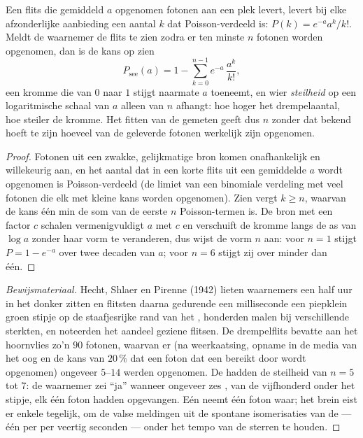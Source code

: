 \begin{theorem}\label{thm:b3:sensory-systems:hecht}
Een flits die gemiddeld $a$ opgenomen fotonen aan een plek 
levert, levert bij elke afzonderlijke aanbieding een aantal $k$ dat
Poisson-verdeeld is: $P(k) = e^{-a}a^{k}/k!$. Meldt de waarnemer de
flits te zien zodra er ten minste $n$ fotonen worden opgenomen, dan is
de kans op zien
\[
P_{\text{see}}(a) = 1 - \sum_{k=0}^{n-1} e^{-a}\,\frac{a^{k}}{k!} ,
\]
een kromme die van $0$ naar $1$ stijgt naarmate $a$ toeneemt, en wier
\emph{steilheid} op een logaritmische schaal van $a$ alleen van $n$
afhangt: hoe hoger het drempelaantal, hoe steiler de kromme. Het fitten
van de gemeten  geeft dus $n$ zonder dat
bekend hoeft te zijn hoeveel van de geleverde fotonen werkelijk zijn
opgenomen.
\end{theorem}
\begin{proof}
Fotonen uit een zwakke, gelijkmatige bron komen onafhankelijk en
willekeurig aan, en het aantal dat in een korte flits uit een
gemiddelde $a$ wordt opgenomen is Poisson-verdeeld (de limiet van een
binomiale verdeling met veel fotonen die elk met kleine kans worden
opgenomen). Zien vergt $k \ge n$, waarvan de kans één min de som van de
eerste $n$ Poisson-termen is. De bron met een factor $c$ schalen
vermenigvuldigt $a$ met $c$ en verschuift de kromme langs de as van $\log a$
zonder haar vorm te veranderen, dus wijst de vorm $n$ aan: voor $n =
1$ stijgt $P = 1 - e^{-a}$ over twee decaden van $a$; voor $n = 6$
stijgt zij over minder dan één.
\end{proof}

\begin{proof}[Bewijsmateriaal]
Hecht, Shlaer en Pirenne (1942) lieten waarnemers een half uur in het
donker zitten en flitsten daarna gedurende een milliseconde een
piepklein groen stipje op de staafjesrijke rand van het ,
honderden malen bij verschillende sterkten, en noteerden het aandeel
geziene flitsen. De drempelflits bevatte aan het hoornvlies zo'n $90$
fotonen, waarvan er (na weerkaatsing, opname in de media van het oog en
de kans van $20\,\%$ dat een foton dat een  bereikt door
 wordt opgenomen) ongeveer $5$--$14$ werden opgenomen. De
 hadden de steilheid van
$n = 5$ tot $7$: de waarnemer zei ``ja'' wanneer ongeveer zes ,
van de vijfhonderd onder het stipje, elk één foton hadden opgevangen.
Eén  neemt één foton waar; het brein eist er enkele tegelijk, om
de valse meldingen uit de spontane isomerisaties van de  ---
één per  per veertig seconden --- onder het tempo van de sterren
te houden.
\end{proof}

